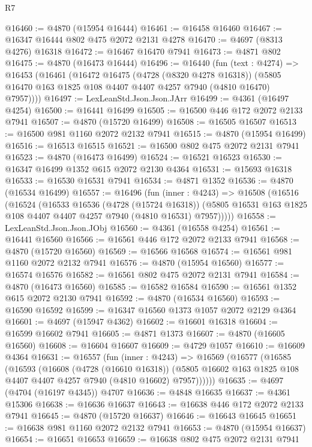 \begin{lexlean}{R7}
\begin{coremodule}
@16460 := @4870 (@15954 @16444)
@16461 := @16458 @16460
@16467 := @16347 @16444 @802 @475 @2072 @2131 @4278
@16470 := @4697 (@8313 @4276) @16318
@16472 := @16467 @16470 @7941
@16473 := @4871 @802
@16475 := @4870 (@16473 @16444)
@16496 := @16440
    (fun (text : @4274) =>
    @16453
      (@16461
        (@16472
          @16475
          (@4728 (@8320 @4278 @16318))
          (@5805 @16470 @163 @1825 @108 @4407 @4407 @4257 @7940 (@4810 @16470) @7957))))
@16497 := LexLeanStd.Json.Json.JArr
@16499 := @4361 (@16497 @4254)
@16500 := @16441 @16499
@16505 := @16500 @446 @172 @2072 @2133 @7941
@16507 := @4870 (@15720 @16499)
@16508 := @16505 @16507
@16513 := @16500 @981 @1160 @2072 @2132 @7941
@16515 := @4870 (@15954 @16499)
@16516 := @16513 @16515
@16521 := @16500 @802 @475 @2072 @2131 @7941
@16523 := @4870 (@16473 @16499)
@16524 := @16521 @16523
@16530 := @16347 @16499 @1352 @615 @2072 @2130 @4364
@16531 := @15693 @16318
@16533 := @16530 @16531 @7941
@16534 := @4871 @1352
@16536 := @4870 (@16534 @16499)
@16557 := @16496
    (fun (inner : @4243) =>
    @16508
      (@16516
        (@16524
          (@16533
            @16536
            (@4728 (@15724 @16318))
            (@5805 @16531 @163 @1825 @108 @4407 @4407 @4257 @7940 (@4810 @16531) @7957)))))
@16558 := LexLeanStd.Json.Json.JObj
@16560 := @4361 (@16558 @4254)
@16561 := @16441 @16560
@16566 := @16561 @446 @172 @2072 @2133 @7941
@16568 := @4870 (@15720 @16560)
@16569 := @16566 @16568
@16574 := @16561 @981 @1160 @2072 @2132 @7941
@16576 := @4870 (@15954 @16560)
@16577 := @16574 @16576
@16582 := @16561 @802 @475 @2072 @2131 @7941
@16584 := @4870 (@16473 @16560)
@16585 := @16582 @16584
@16590 := @16561 @1352 @615 @2072 @2130 @7941
@16592 := @4870 (@16534 @16560)
@16593 := @16590 @16592
@16599 := @16347 @16560 @1373 @1057 @2072 @2129 @4364
@16601 := @4697 (@15947 @4362)
@16602 := @16601 @16318
@16604 := @16599 @16602 @7941
@16605 := @4871 @1373
@16607 := @4870 (@16605 @16560)
@16608 := @16604 @16607
@16609 := @4729 @1057
@16610 := @16609 @4364
@16631 := @16557
    (fun (inner : @4243) =>
    @16569
      (@16577
        (@16585
          (@16593
            (@16608
              (@4728 (@16610 @16318))
              (@5805 @16602 @163 @1825 @108 @4407 @4407 @4257 @7940 (@4810 @16602) @7957))))))
@16635 := @4697 (@4704 (@16197 @4345)) @4707
@16636 := @4848 @16635
@16637 := @4361 @15306
@16638 := @16636 @16637
@16643 := @16638 @446 @172 @2072 @2133 @7941
@16645 := @4870 (@15720 @16637)
@16646 := @16643 @16645
@16651 := @16638 @981 @1160 @2072 @2132 @7941
@16653 := @4870 (@15954 @16637)
@16654 := @16651 @16653
@16659 := @16638 @802 @475 @2072 @2131 @7941

\end{coremodule}
\end{lexlean}

